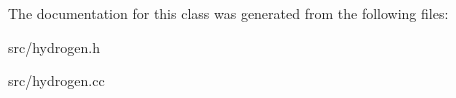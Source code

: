 The documentation for this class was generated from the following files\+:\begin{DoxyCompactItemize}
\item 
src/hydrogen.\+h\item 
src/hydrogen.\+cc\end{DoxyCompactItemize}
